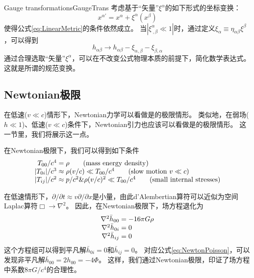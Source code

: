 \begin{myprop}{Gauge transformations}{GaugeTrans}
  考虑基于“矢量”$\xi^\alpha$的如下形式的坐标变换：
\begin{equation}\label{eq:ChangeCoord}
  x^{\alpha\prime} = x^{\alpha} + \xi^\alpha(x^\beta)
\end{equation}
  使得公式\ref{eq:LinearMetric}的条件依然成立。
  当$|\xi^\alpha_{~,\beta} \ll 1|$时，通过定义$\xi_\alpha \equiv \eta_{\alpha\beta}\xi^\beta$，可以得到 
\begin{equation}\label{eq:habChange}
  h_{\alpha\beta} \to h_{\alpha\beta} - \xi_{\alpha,\beta}- \xi_{\beta,\alpha}
\end{equation}
通过合理选取“矢量”$\xi^\alpha$，可以在不改变公式物理本质的前提下，简化数学表达式。
这就是所谓的规范变换。
\end{myprop}


\subsection{Newtonian极限}
在低速($v \ll c$)情形下，Newtonian力学可以看做是\SR 的极限情形。
类似地，在弱场($h \ll 1$)、低速($v \ll c$)条件下，Newtonian引力也应该可以看做是\GR 的极限情形。
这一节里，我们将展示这一点。

在Newtonian极限下，我们可以得到如下条件
\begin{equation}\label{eq:TmunuNewton}
\begin{array}{r@{}l}
  T_{00}/c^4      &{} = \rho \qquad ({\rm mass~energy~density}) \\
  | T_{0i}| /c^3  &{} \approx \rho (v/c) \ll T_{00}/c^4 \qquad ({\rm slow~motion}~v \ll c) \\
  | T_{ij}| /c^2  &{} \approx p/c^2 \& \rho(v/c)^2 \ll T_{00}/c^4 \qquad ({\rm small~internal~stresses})
\end{array}
\end{equation}

在低速情形下，$\partial /\partial t \approx v \partial /\partial x $是小量，由此d’Alembertian算符可以近似为空间Laplac算符$\Box \to \nabla^2$。
因此，在Newtonian极限下，场方程退化为
\begin{equation}\label{eq:EinsteinEqNewton}
\begin{array}{r@{}l}
  \nabla^2 \bar{h}_{00} &{}= -16\pi G \rho\\
  \nabla^2 \bar{h}_{0i} &{}= 0 \\
  \nabla^2 \bar{h}_{ij} &{}= 0 \\
\end{array}
\end{equation}
这个方程组可以得到平凡解$\bar{h}_{0i} = 0$和$\bar{h}_{ij}= 0 $。
对应公式\ref{eq:NewtonPoisson}，可以发现非平凡解$\bar{h}_{00}=2h_{00}=-4\Phi$。
这样，我们通过Newtonian极限，印证了场方程中系数$8\pi G/c^4$的合理性。

